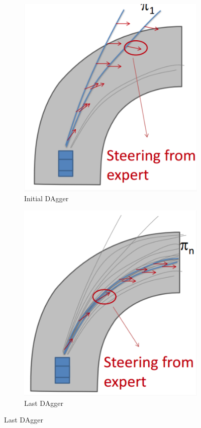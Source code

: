\documentclass[11pt,xcolor={dvipsnames},hyperref={pdftex,pdfpagemode=UseNone,hidelinks,pdfdisplaydoctitle=true},usepdftitle=false]{beamer}
\begin{document}
\begin{frame}
\begin{figure}[ht]
    \begin{subfigure}[b]{0.3\textwidth}
        \centering
        \includegraphics[width=\textwidth]{figs/dagger1.png}
        \caption{{\small Initial DAgger}}
        \label{fig:dagger1}
    \end{subfigure}
    \begin{subfigure}[b]{0.3\textwidth}
        \centering
        \includegraphics[width=\textwidth]{figs/daggern.png}
        \caption{{\small Last DAgger}}
        \label{fig:daggern}
    \end{subfigure}\end{figure}
\end{frame}
\end{document}
